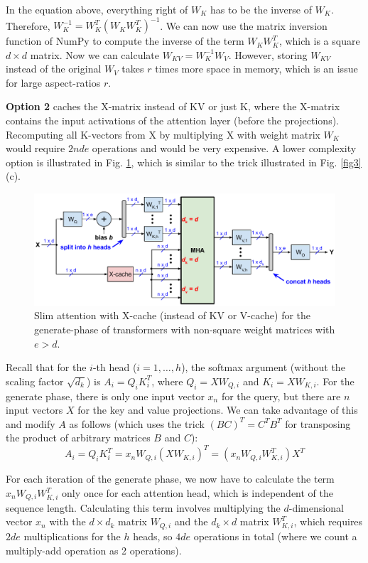 \documentclass{article}
\numberwithin{equation}{section} %
\begin{document}
In the equation above, everything right of $W_K$ has to be the inverse of $W_K$. Therefore, $W_K^{-1} = W_K^T (W_K W_K^T)^{-1}$. We can now use the matrix inversion function of NumPy to compute the inverse of the term $W_K W_K^T$, which is a square $d \times d$ matrix. Now we can calculate $W_{KV} = W_K^{-1} W_V$. However, storing $W_{KV}$ instead of the original $W_V$ takes $r$ times more space in memory, which is an issue for large aspect-ratios $r$.

\textbf{Option 2} caches the X-matrix instead of KV or just K, where the X-matrix contains the input activations of the attention layer (before the projections). Recomputing all K-vectors from X by multiplying X with weight matrix $W_K$ would require $2 n d e$ operations and would be very expensive. A lower complexity option is illustrated in Fig. \ref{fig4}, which is similar to the trick illustrated in Fig. \ref{fig3}(c).
\begin{figure}[h!] \centering
  \includegraphics[scale=0.9]{figs/slim_fig4.pdf}
  \caption{Slim attention with X-cache (instead of KV or V-cache) for the generate-phase of transformers with non-square weight matrices with $e > d$.}
\label{fig4} \end{figure}
Recall that for the $i$-th head ($i = 1, \ldots, h$), the softmax argument (without the scaling factor $\sqrt{d_k}$) is $A_i = Q_i K_i^T$, where $Q_i = X W_{Q,i}$ and $K_i = X W_{K,i}$. For the generate phase, there is only one input vector $x_n$ for the query, but there are $n$ input vectors $X$ for the key and value projections. We can take advantage of this and modify $A$ as follows (which uses the trick $(B C)^T = C^T B^T$ for transposing the product of arbitrary matrices $B$ and $C$):
\begin{equation*}
  A_i = Q_i K_i^T = x_n W_{Q,i} (X W_{K,i})^T = (x_n W_{Q,i} W_{K,i}^T) X^T
\end{equation*}

For each iteration of the generate phase, we now have to calculate the term $x_n W_{Q,i} W_{K,i}^T$ only once for each attention head, which is independent of the sequence length. Calculating this term involves multiplying the $d$-dimensional vector $x_n$ with the $d \times d_k$ matrix $W_{Q,i}$ and the $d_k \times d$ matrix $W_{K,i}^T$, which requires $2 d e$ multiplications for the $h$ heads, so $4 d e$ operations in total (where we count a multiply-add operation as 2 operations).
\end{document}
